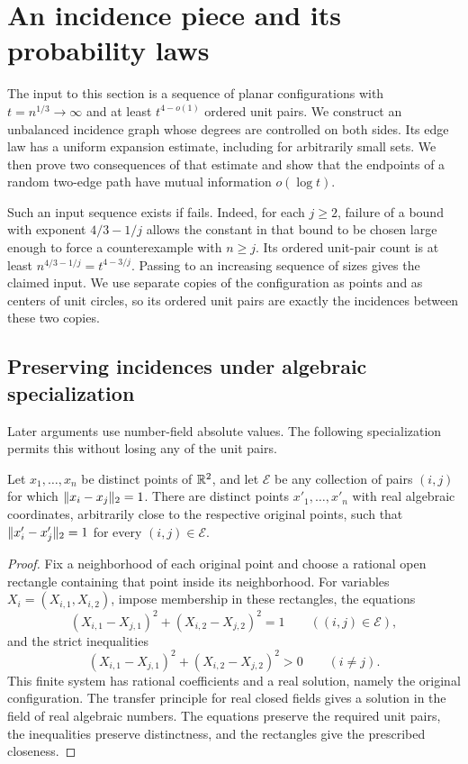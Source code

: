 \section{An incidence piece and its probability laws}\label{sec:incidence}

The input to this section is a sequence of planar configurations with
\(t=n^{1/3}\to\infty\) and at least \(t^{4-o(1)}\) ordered unit pairs.
We construct an unbalanced incidence graph whose degrees are controlled
on both sides. Its edge law has a uniform expansion estimate, including
for arbitrarily small sets. We then prove two consequences of that
estimate and show that the endpoints of a random two-edge path have
mutual information \(o(\log t)\).

Such an input sequence exists if  fails. Indeed, for each
\(j\ge2\), failure of a bound with exponent \(4/3-1/j\) allows the
constant in that bound to be chosen large enough to force a counterexample
with \(n\ge j\). Its ordered unit-pair count is at least
\(n^{4/3-1/j}=t^{4-3/j}\). Passing to an increasing sequence of sizes
gives the claimed input. We use separate copies of the configuration as
points and as centers of unit circles, so its ordered unit pairs are
exactly the incidences between these two copies.

\subsection{Preserving incidences under algebraic specialization}

Later arguments use number-field absolute values. The following
specialization permits this without losing any of the unit pairs.

\begin{lemma}\label{inc:specialization}
Let \(x_1,\ldots,x_n\) be distinct points of \(\mathbb R^2\), and let
\(\mathcal E\) be any collection of pairs \((i,j)\) for which
\(\lVert x_i-x_j\rVert_2=1\). There are distinct points
\(x'_1,\ldots,x'_n\) with real algebraic coordinates, arbitrarily close
to the respective original points, such that
\(\lVert x'_i-x'_j\rVert_2=1\) for every \((i,j)\in\mathcal E\).
\end{lemma}

\begin{proof}
Fix a neighborhood of each original point and choose a rational open
rectangle containing that point inside its neighborhood. For variables
\(X_i=(X_{i,1},X_{i,2})\), impose membership in these rectangles,
the equations
\[
 (X_{i,1}-X_{j,1})^2+(X_{i,2}-X_{j,2})^2=1
       \qquad ((i,j)\in\mathcal E),
\]
and the strict inequalities
\[
 (X_{i,1}-X_{j,1})^2+(X_{i,2}-X_{j,2})^2>0
       \qquad (i\ne j).
\]
This finite system has rational coefficients and a real solution, namely
the original configuration. The transfer principle for real closed fields
\cite[Theorems~3.1 and~4.1]{RCFTransfer} gives a solution in the field
of real algebraic numbers. The equations preserve the required unit pairs,
the inequalities preserve distinctness, and the rectangles give the
prescribed closeness.
\end{proof}

